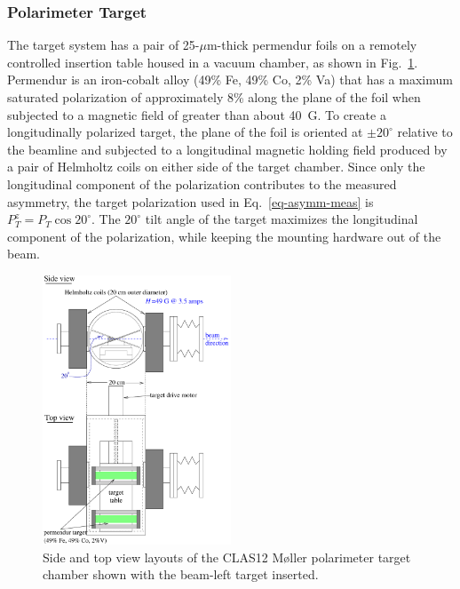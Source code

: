 \subsubsection{Polarimeter Target}
\label{sec-PolTgt}

The target system has a pair of 25-$\mu$m-thick permendur foils on a remotely controlled insertion table housed
in a vacuum chamber, as shown in Fig.~\ref{fig-MPtgt}. Permendur is an iron-cobalt alloy (49\% Fe, 49\% Co, 2\% Va)
that has a maximum saturated polarization of approximately 8\% along the plane of the foil when subjected to a
magnetic field of greater than about 40~G. To create a longitudinally polarized target, the plane of the foil is 
oriented at $\pm 20^\circ$ relative to the beamline and subjected to a longitudinal magnetic holding field produced
by a pair of Helmholtz coils on either side of the target chamber. Since only the longitudinal component of the
polarization contributes to the measured asymmetry, the target polarization used in Eq.~\ref{eq-asymm-meas} is
$P_T^z=P_T\cos 20^\circ$. The $ 20^\circ$ tilt angle of the target maximizes the longitudinal component of the
polarization, while keeping the mounting hardware out of the beam.

\begin{figure}[hbtp]
 \begin{center}
  \includegraphics[width=0.5\textwidth]{MPtgt.pdf}
 \end{center}
 \caption{Side and top view layouts of the CLAS12 M{\o}ller polarimeter target chamber shown with the
   beam-left target inserted.}
 \label{fig-MPtgt}
\end{figure}

